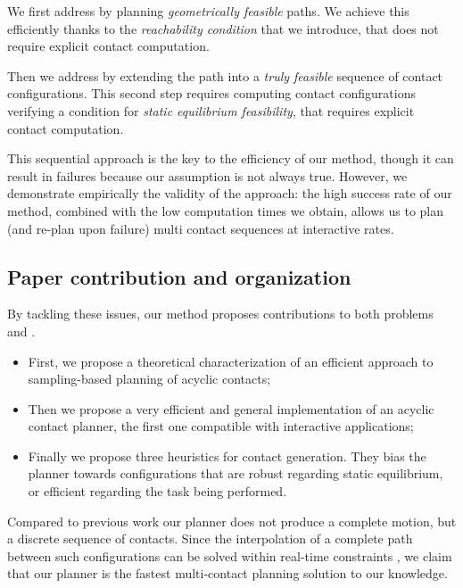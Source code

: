 We first address \Pa by planning \textit{geometrically feasible} paths. We achieve this efficiently thanks to the \textit{reachability condition} that we introduce, that 
does not require explicit contact computation.

Then we address \Pb by extending the path into a \textit{truly feasible} sequence of contact configurations.
This second step requires computing contact configurations verifying a condition for \textit{static equilibrium feasibility}, that requires
explicit contact computation.

This sequential approach is the key to the efficiency of our method, though it
can result in failures because our assumption is not always true. However, we demonstrate empirically the validity of the approach: the high success rate of our method, combined with the low computation times we obtain, allows us to plan (and re-plan upon failure) multi contact sequences at interactive rates.

\subsection{Paper contribution and organization}


By tackling these issues, our method proposes contributions to both problems \Pa and \Pb.
\begin{itemize}
\item First, we propose a theoretical characterization of an efficient approach to sampling-based planning of acyclic contacts;
\item Then we propose a very efficient and general implementation of an acyclic contact planner, the first one compatible with interactive applications;
\item Finally we propose three heuristics for contact generation. They bias the planner towards configurations that are robust regarding static equilibrium, or 
efficient regarding the task being performed.
\end{itemize}

Compared to previous work \citep{Mordatch:2012:DCB:2185520.2185539} our planner does not produce a complete motion, but a discrete sequence of contacts.
Since the interpolation of a complete path between such configurations can be solved within real-time constraints \citep{Carpentier2016}, we claim that our planner
is the fastest multi-contact planning solution to our knowledge.

